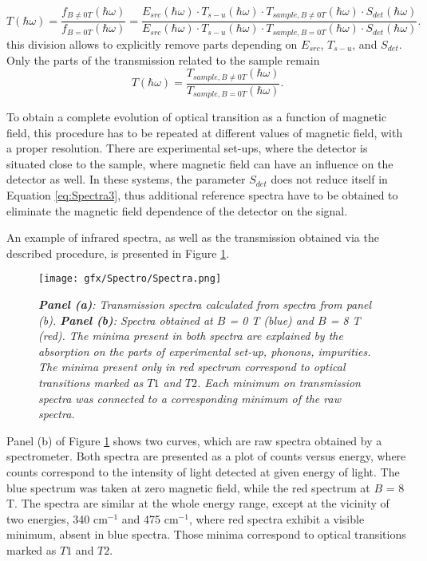 \documentclass[titlepage,a4paper]{book}
\begin{document}
\begin{equation}
\label{eq:Spectra3}
T(\hbar\omega) = \frac{f_{B\neq 0T}(\hbar\omega)}{f_{B=0T}(\hbar\omega)} = \frac{E_{src}(\hbar\omega)\cdot T_{s-u}(\hbar\omega)\cdot T_{sample,B\neq 0T}(\hbar\omega)\cdot S_{det}(\hbar\omega)}{E_{src}(\hbar\omega)\cdot T_{s-u}(\hbar\omega)\cdot T_{sample,B=0T}(\hbar\omega)\cdot S_{det}(\hbar\omega)}.
\end{equation}
this division allows to explicitly remove parts depending on $E_{src}$, $T_{s-u}$, and $S_{det}$. Only the parts of the transmission related to the sample remain
\begin{equation}
\label{eq:Spectra4}
T(\hbar\omega) = \frac{T_{sample,B\neq 0T}(\hbar\omega)}{ T_{sample,B=0T}(\hbar\omega)}.
\end{equation}

To obtain a complete evolution of optical transition as a function of magnetic field, this procedure has to be repeated at different values of magnetic field, with a proper resolution. There are experimental set-ups, where the detector is situated close to the sample, where magnetic field can have an influence on the detector as well. In these systems, the parameter $S_{det}$ does not reduce itself in Equation \ref{eq:Spectra3}, thus additional reference spectra have to be obtained to eliminate the magnetic field dependence of the detector on the signal.

An example of infrared spectra, as well as the transmission obtained via the described procedure, is presented in Figure \ref{fig:Spectra}.

\begin{figure}[ht]
	\centering
	\texttt{[image: gfx/Spectro/Spectra.png]}
	\vspace{-10pt}
	\caption{\textit{\textbf{Panel (a)}: Transmission spectra calculated from spectra from panel (b). \textbf{Panel (b)}: Spectra obtained at $B$ = 0 T (blue) and $B$ = 8 T (red). The minima present in both spectra are explained by the absorption on the parts of experimental set-up, phonons, impurities. The minima present only in red spectrum correspond to optical transitions marked as $T1$ and $T2$. Each minimum on transmission spectra was connected to a corresponding minimum of the raw spectra.}}
	\label{fig:Spectra}
\end{figure}

Panel (b) of Figure \ref{fig:Spectra} shows two curves, which are raw spectra obtained by a spectrometer. Both spectra are presented as a plot of counts versus energy, where counts correspond to the intensity of light detected at given energy of light. The blue spectrum was taken at zero magnetic field, while the red spectrum at $B$ = 8 T. The spectra are similar at the whole energy range, except at the vicinity of two energies, 340 cm$^{-1}$ and 475 cm$^{-1}$, where red spectra exhibit a visible minimum, absent in blue spectra. Those minima correspond to optical transitions marked as $T1$ and $T2$. 
\end{document}
